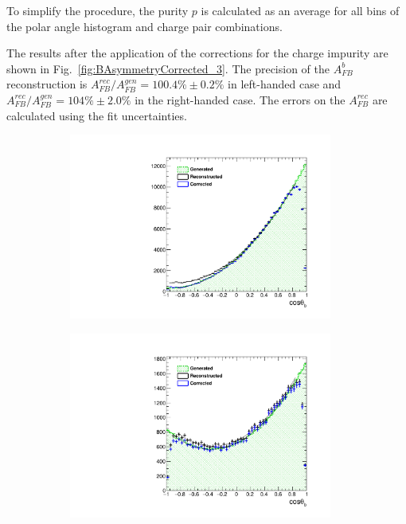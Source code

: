 To simplify the procedure, the purity $p$ is calculated as an average for all bins of the polar angle histogram and charge pair combinations. 


The results after the application of the corrections for the charge impurity are shown in Fig.~\ref{fig:BAsymmetryCorrected_3}. 
The precision of the $A_{FB}^b$ reconstruction is $A_{FB}^{rec}/A^{gen}_{FB} = 100.4\%\pm 0.2\%$ in left-handed case and  $A_{FB}^{rec}/A^{gen}_{FB} = 104\%\pm2.0\%$ in the right-handed case. 
The errors on the $A_{FB}^{rec}$ are calculated using the fit uncertainties. 

\begin{figure}
	\centering
	\begin{subfigure}{0.5\textwidth}
		\includegraphics[width=0.95\textwidth]{ILD/plots/basymmetry-rec-corr-nobkg-left.pdf}
		\caption{\label{fig:BAsymmetryCorrected_a_3} }
	\end{subfigure}%
	\begin{subfigure}{0.5\textwidth}
		\centering
			\includegraphics[width=0.95\textwidth]{ILD/plots/basymmetry-rec-corr-nobkg-right.pdf}

\end{subfigure}
\end{figure}
